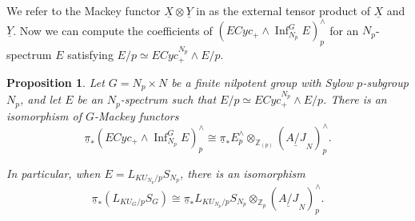 \documentclass{amsart}
\theoremstyle{plain}
\newtheorem{proposition}[theorem]{Proposition}
\theoremstyle{definition}
\theoremstyle{remark}
\begin{document}
We refer to the Mackey functor $\underline{X}\otimes \underline Y$ in  as the external tensor product of $\underline X$ and $\underline Y$. Now we can compute the coefficients of $(ECyc_+ \wedge \operatorname{Inf}_{N_p}^G E)_p^\wedge$ for an $N_p$-spectrum $E$ satisfying $E/p\simeq ECyc^{N_p}_+ \wedge E/p$. 

\begin{proposition}\label{lem:Z graded homotopy Mackey functor of ECyc inf}
    Let $G=N_p\times N$ be a finite nilpotent group with Sylow $p$-subgroup $N_p$, and let $E$ be an $N_p$-spectrum such that  $E/p\simeq ECyc^{N_p}_+ \wedge E/p$. There is an isomorphism of $G$-Mackey functors
    \[ \underline{\pi}_*(ECyc_+\wedge \operatorname{Inf}_{N_p}^G E)_p^\wedge\cong \underline{\pi}_* E_p^\wedge \otimes_{\mathbb Z_{(p)}} (\underline{A/J}_N)_p^\wedge. \] 

    In particular, when $E=L_{KU_{N_p}/p}S_{N_p}$, there is an isomorphism
    \[\underline{\pi}_*(L_{KU_G/p}S_G)\cong \underline{\pi}_*L_{KU_{N_p}/p}S_{N_p}\otimes_{\mathbb{Z}_p} (\underline{A/J}_N)_p^\wedge.\]
\end{proposition}
\end{document}
